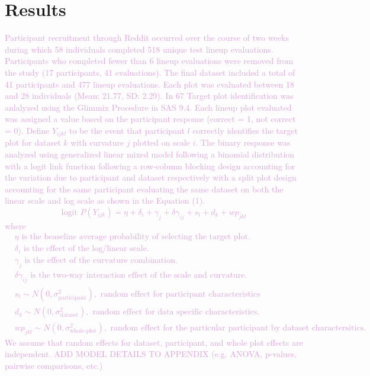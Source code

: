\documentclass[]{interact}
\theoremstyle{plain}%
\theoremstyle{definition}
\theoremstyle{remark}
\begin{document}
\hypertarget{results}{%
\section{Results}\label{results}}

\textcolor{Plum}{
Participant recruitment through Reddit occurred over the course of two weeks during which 58 individuals completed 518 unique test lineup evaluations. 
Participants who completed fewer than 6 lineup evaluations were removed from the study (17 participants, 41 evaluations).
The final dataset included a total of 41 participants and 477 lineup evaluations. 
Each plot was evaluated between 18 and 28 individuals (Mean: 21.77, SD: 2.29). In 67%
}
\textcolor{Plum}{
Target plot identification was anlalyzed using the Glimmix Procedure in SAS 9.4. 
Each lineup plot evaluated was assigned a value based on the participant response (correct = 1, not correct = 0). 
Define $Y_{ijkl}$ to be the event that participant $l$ correctly identifies the target plot for dataset $k$ with curvature $j$ plotted on scale $i$. 
The binary response was analyzed using generalized linear mixed model following a binomial distribution with a logit link function following a row-column blocking design accounting for the variation due to participant and dataset respectively with a split plot design accounting for the same participant evaluating the same dataset on both the linear scale and log scale as shown in the Equation (1).
\begin{equation}
\text{logit }P(Y_{ijk}) = \eta + \delta_i + \gamma_j + \delta \gamma_{ij} + s_l + d_k + wp_{jkl}
\end{equation}
where
\begin{align*}
&\eta               \text{ is the beaseline average probability of selecting the target plot.} \\
&\delta_i           \text{ is the effect of the log/linear scale.} \\
&\gamma_j           \text{ is the effect of the curvature combination.} \\
&\delta\gamma_{ij}  \text{ is the two-way interaction effect of the scale and curvature.} \\
&s_l \sim N(0,\sigma^2_\text{{participant}}), \text{ random effect for participant characteristics} \\
&d_k \sim N(0,\sigma^2_{\text{dataset}}), \text{ random effect for data specific characteristics.} \\
&wp_{jkl} \sim N(0,\sigma^2_\text{{whole-plot}}), \text{ random effect for the particular participant by dataset charactersitics.}
\end{align*}
We assume that random effects for dataset, participant, and whole plot effects are independent. ADD MODEL DETAILS TO APPENDIX (e.g. ANOVA, p-values, pairwise comparisons, etc.)
}
\end{document}
